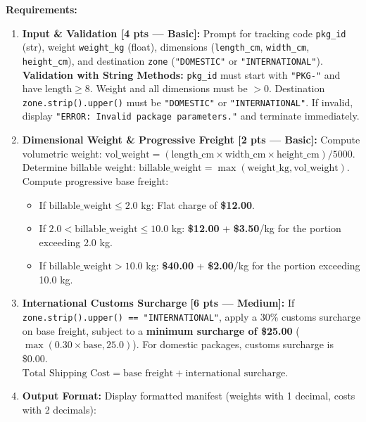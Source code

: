 \documentclass[11pt,a4paper]{article}
\begin{document}
\textbf{Requirements:}
\begin{enumerate}[label=\arabic*.,leftmargin=1.8em,itemsep=0.6pt]
  \item \textbf{Input \& Validation [4 pts --- Basic]:}
    Prompt for tracking code \texttt{pkg\_id} (str), weight \texttt{weight\_kg} (float), dimensions (\texttt{length\_cm}, \texttt{width\_cm}, \texttt{height\_cm}), and destination \texttt{zone} (\texttt{"DOMESTIC"} or \texttt{"INTERNATIONAL"}).\\
    \textbf{Validation with String Methods:} \texttt{pkg\_id} must start with \texttt{"PKG-"} and have $\text{length} \ge 8$. Weight and all dimensions must be $> 0$. Destination \texttt{zone.strip().upper()} must be \texttt{"DOMESTIC"} or \texttt{"INTERNATIONAL"}. If invalid, display \texttt{"ERROR: Invalid package parameters."} and terminate immediately.
  \item \textbf{Dimensional Weight \& Progressive Freight [2 pts --- Basic]:}
    Compute volumetric weight: $\text{vol\_weight} = (\text{length\_cm} \times \text{width\_cm} \times \text{height\_cm}) / 5000$.\\
    Determine billable weight: $\text{billable\_weight} = \max(\text{weight\_kg}, \text{vol\_weight})$.\\
    Compute progressive base freight:
    \begin{itemize}[itemsep=0.2pt]
      \item If $\text{billable\_weight} \le 2.0$ kg: Flat charge of \textbf{\$12.00}.
      \item If $2.0 < \text{billable\_weight} \le 10.0$ kg: \textbf{\$12.00} + \textbf{\$3.50}/kg for the portion exceeding 2.0 kg.
      \item If $\text{billable\_weight} > 10.0$ kg: \textbf{\$40.00} + \textbf{\$2.00}/kg for the portion exceeding 10.0 kg.
    \end{itemize}
  \item \textbf{International Customs Surcharge [6 pts --- Medium]:}
    If \texttt{zone.strip().upper() == "INTERNATIONAL"}, apply a 30\% customs surcharge on base freight, subject to a \textbf{minimum surcharge of \$25.00} ($\max(0.30 \times \text{base}, 25.0)$). For domestic packages, customs surcharge is \$0.00.\\
    $\text{Total Shipping Cost} = \text{base freight} + \text{international surcharge}$.
  \item \textbf{Output Format:} Display formatted manifest (weights with 1 decimal, costs with 2 decimals):
\end{enumerate}
\end{document}
